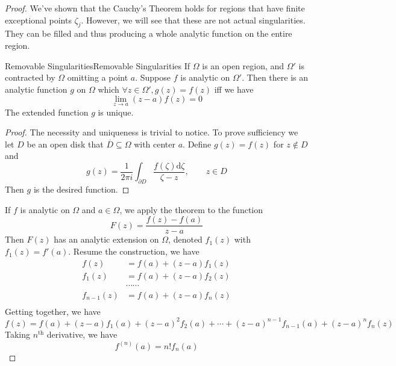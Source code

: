 \documentclass[../main.tex]{subfiles}
\begin{document}
\begin{proof}
We've shown that the Cauchy's Theorem holds for regions that have finite exceptional points $\zeta_j$. However, we will see that these are not actual singularities. They can be filled and thus producing a whole analytic function on the entire region.

\begin{theorem}{Removable Singularities}{Removable Singularities}
	If $\Omega$ is an open region, and $\Omega'$ is contracted by $\Omega$ omitting a point $a$. Suppose $f$ is analytic on $\Omega'$. Then there is an analytic function $g$ on $\Omega$ which $\forall z\in \Omega', g(z) = f(z)$ iff we have
	\begin{equation*}
	\lim_{z \to a} (z-a)f(z) = 0
	\end{equation*}
	The extended function $g$ is unique.
\end{theorem}
\begin{proof}
The necessity and uniqueness is trivial to notice. To prove sufficiency we let $D$ be an open disk that $\overline{D} \subseteq \Omega$ with center $a$. Define $g(z) = f(z)$ for $z\notin D$ and
\begin{equation*}
g(z) = \frac{1}{2 \pi i}\int_{\partial D} \frac{f(\zeta) \mathrm{d} \zeta}{\zeta-z}, \qquad z\in D
\end{equation*}
Then $g$ is the desired function.
\end{proof}

If $f$ is analytic on $\Omega$ and $a\in \Omega$, we apply the theorem to the function
\begin{equation*}
	F(z) = \frac{f(z) - f(a)}{z-a}
\end{equation*}
Then $F(z)$ has an analytic extension on $\Omega$, denoted $f_1(z)$ with $f_1(z) = f'(a)$. Resume the construction, we have
\begin{equation}
\begin{aligned}
	f(z) &= f(a) + (z-a) f_1(z)\\
	f_1(z) &= f(a) + (z-a) f_2(z)\\
	       &\cdots \cdots \\
	f_{n-1}(z) &= f(a) + (z-a) f_n(z)\\
\end{aligned}
\end{equation}
Getting together, we have
\begin{equation*}
f(z) = f(a) + (z-a)f_1(a) + (z-a)^2f_2(a) + \cdots + (z-a)^{n-1}f_{n-1}(a) + (z-a)^n f_n(z)
\end{equation*}
Taking $n^{\text{th}}$ derivative, we have
\begin{equation*}
f^{(n)}(a) = n!f_n(a)
\end{equation*}


\end{proof}
\end{document}
